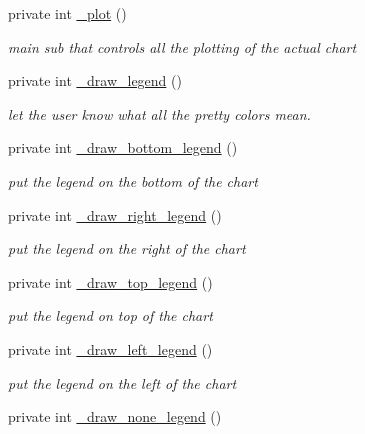 \begin{DoxyCompactItemize}
private int \hyperlink{classChart_1_1Base_aa13b0e86a933ce6b865c098fd0bdb37d}{\_\-plot} ()
\begin{DoxyCompactList}\small\item\em main sub that controls all the plotting of the actual chart \item\end{DoxyCompactList}\item 
private int \hyperlink{classChart_1_1Base_a530e742ca18ce2e89f177d367964277f}{\_\-draw\_\-legend} ()
\begin{DoxyCompactList}\small\item\em let the user know what all the pretty colors mean. \item\end{DoxyCompactList}\item 
private int \hyperlink{classChart_1_1Base_a863d96ec45b7fbd5ff05194f4eb827d0}{\_\-draw\_\-bottom\_\-legend} ()
\begin{DoxyCompactList}\small\item\em put the legend on the bottom of the chart \item\end{DoxyCompactList}\item 
private int \hyperlink{classChart_1_1Base_a39f25b556f2d82e176fc6b0ccfc6da17}{\_\-draw\_\-right\_\-legend} ()
\begin{DoxyCompactList}\small\item\em put the legend on the right of the chart \item\end{DoxyCompactList}\item 
private int \hyperlink{classChart_1_1Base_a2f3f15efadc46484126c94780748a534}{\_\-draw\_\-top\_\-legend} ()
\begin{DoxyCompactList}\small\item\em put the legend on top of the chart \item\end{DoxyCompactList}\item 
private int \hyperlink{classChart_1_1Base_a39bad67aecd83bf523bc27d397256480}{\_\-draw\_\-left\_\-legend} ()
\begin{DoxyCompactList}\small\item\em put the legend on the left of the chart \item\end{DoxyCompactList}\item 
private int \hyperlink{classChart_1_1Base_a2ec9e89bd6719e178877577a72750cb7}{\_\-draw\_\-none\_\-legend} ()

\end{DoxyCompactItemize}
